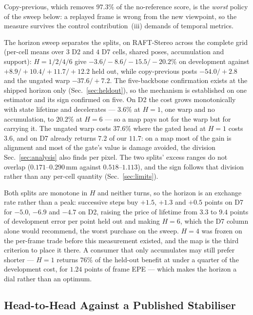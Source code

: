 \documentclass[letterpaper,10pt,conference]{ieeeconf}
\begin{document}
Copy-previous, which removes $97.3\%$ of the no-reference score, is the
\emph{worst} policy of the sweep below: a replayed frame is wrong from
the new viewpoint, so the measure survives the control contribution~(iii)
demands of temporal metrics.

The horizon sweep separates the splits, on RAFT-Stereo across the complete
grid (per-cell means over $3$ D2 and $4$ D7 cells, shared poses, accumulation
and support): $H{=}1/2/4/6$ give $-3.6/-8.6/-15.5/-20.2\%$ on development
against $+8.9/+10.4/+11.7/+12.2$ held out, while copy-previous posts
$-54.0/+2.8$ and the ungated warp $-37.6/+7.2$. The five-backbone
confirmation exists at the shipped horizon only (Sec.~\ref{sec:heldout}), so
the mechanism is established on one estimator and its sign confirmed on
five. On D2 the cost grows monotonically
with state lifetime and decelerates --- $3.6\%$ at $H{=}1$, one warp and no
accumulation, to $20.2\%$ at $H{=}6$ --- so a map pays not for the warp but
for carrying it. The ungated warp costs $37.6\%$ where the gated head at $H{=}1$ costs $3.6$,
and on D7 already returns $7.2$ of our $11.7$: on a map most of the gain is
alignment and most of the gate's value is damage avoided, the division
Sec.~\ref{sec:analysis} also finds per pixel.
The two splits' excess ranges do not overlap ($0.171$--$0.290$\,mm against
$0.518$--$1.113$), and the sign follows that division rather than any per-cell
quantity (Sec.~\ref{sec:limits}).

Both splits are monotone in $H$ and neither turns, so the horizon is an
exchange rate rather than a peak: successive steps buy $+1.5$, $+1.3$ and
$+0.5$ points on D7 for $-5.0$, $-6.9$ and $-4.7$ on D2, raising the price of
lifetime from $3.3$ to $9.4$ points of development error per point held out and
making $H{=}6$, which the D7 column alone would recommend, the worst purchase on
the sweep. $H{=}4$ was frozen on the per-frame trade before this measurement
existed, and the map is the third criterion to place it there. A consumer that
only accumulates may still prefer shorter --- $H{=}1$ returns $76\%$ of the
held-out benefit at under a quarter of the development cost, for $1.24$ points
of frame EPE --- which makes the horizon a dial rather than an optimum.

\subsection{Head-to-Head Against a Published Stabiliser}
\label{sec:bida}
\end{document}
